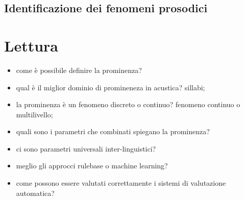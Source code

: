 \documentclass[twoside,twocolumn,11pt]{extarticle}
\theoremstyle{definition}
\begin{document}
	\subsection{Identificazione dei fenomeni prosodici}
	
\section{Lettura \cite{bib:prominence-by-acoustic-analyses}}
	\begin{itemize}
		\item come è possibile definire la prominenza?
		\item qual è il miglior dominio di promineneza in acustica? sillabi;
		\item la prominenza è un fenomeno discreto o continuo? fenomeno continuo o multilivello;
		\item quali sono i parametri che combinati spiegano la prominenza? 
		\item ci sono parametri universali inter-linguistici?
		\item meglio gli approcci rulebase o machine learning?
		\item come possono essere valutati correttamente i sistemi di valutazione automatica?
	\end{itemize}
\end{document}
